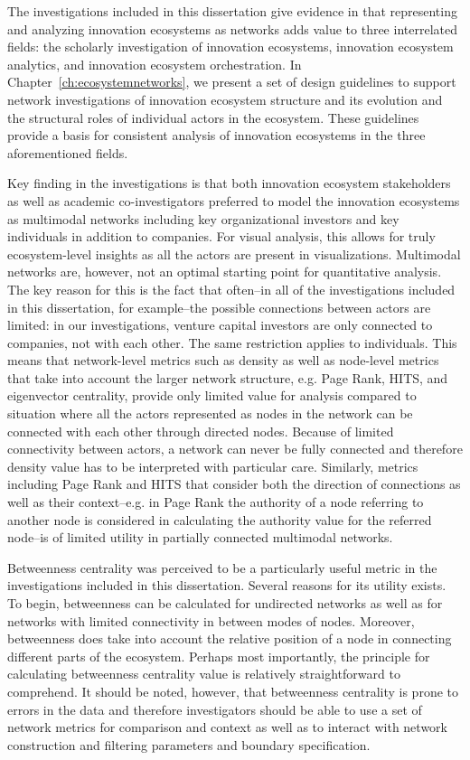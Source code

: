 The investigations included in this dissertation give evidence in that representing and analyzing innovation ecosystems as networks adds value to three interrelated fields: the scholarly investigation of innovation ecosystems, innovation ecosystem analytics, and innovation ecosystem orchestration. In Chapter~\ref{ch:ecosystemnetworks}, we present a set of design guidelines to support network investigations of innovation ecosystem structure and its evolution and the structural roles of individual actors in the ecosystem. These guidelines provide a basis for consistent analysis of innovation ecosystems in the three aforementioned fields. 

Key finding in the investigations is that both innovation ecosystem stakeholders as well as academic co-investigators preferred to model the innovation ecosystems as multimodal networks including key organizational investors and key individuals in addition to companies. For visual analysis, this allows for truly ecosystem-level insights as all the actors are present in visualizations. Multimodal networks are, however, not an optimal starting point for quantitative analysis. The key reason for this is the fact that often--in all of the investigations included in this dissertation, for example--the possible connections between actors are limited: in our investigations, venture capital investors are only connected to companies, not with each other. The same restriction applies to individuals. This means that network-level metrics such as density as well as node-level metrics that take into account the larger network structure, e.g. Page Rank, HITS, and eigenvector centrality, provide only limited value for analysis compared to situation where all the actors represented as nodes in the network can be connected with each other through directed nodes. Because of limited connectivity between actors, a network can never be fully connected and therefore density value has to be interpreted with particular care. Similarly, metrics including Page Rank and HITS that consider both the direction of connections as well as their context--e.g. in Page Rank the authority of a node referring to another node is considered in calculating the authority value for the referred node--is of limited utility in partially connected multimodal networks.

Betweenness centrality was perceived to be a particularly useful metric in the investigations included in this dissertation. Several reasons for its utility exists. To begin, betweenness can be calculated for undirected networks as well as for networks with limited connectivity in between modes of nodes. Moreover, betweenness does take into account the relative position of a node in connecting different parts of the ecosystem. Perhaps most importantly, the principle for calculating betweenness centrality value is relatively straightforward to comprehend. It should be noted, however, that betweenness centrality is prone to errors in the data and therefore investigators should be able to use a set of network metrics for comparison and context as well as to interact with network construction and filtering parameters and boundary specification.

